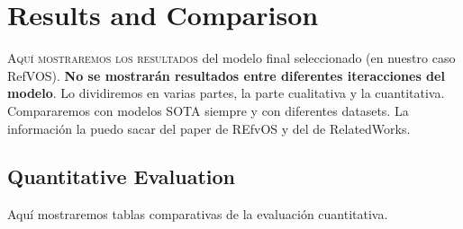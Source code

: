 

\chapter{Results and Comparison}\label{cha:results}



\lettrine{A}{quí mostraremos los resultados} del modelo final seleccionado (en
nuestro caso RefVOS). \textbf{No se mostrarán resultados entre diferentes
  iteracciones del modelo}. Lo dividiremos en varias partes, la parte
cualitativa y la cuantitativa. Compararemos con modelos SOTA siempre y con
diferentes datasets. La información la puedo sacar del paper de REfvOS y del de
RelatedWorks.


\section{Quantitative Evaluation}\label{sec:quantitative-eval}

Aquí mostraremos tablas comparativas de la evaluación cuantitativa.


